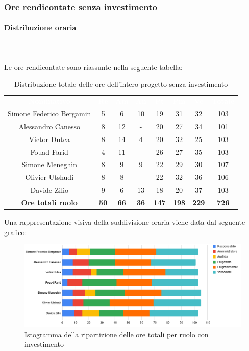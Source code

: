 \subsubsection{Ore rendicontate senza investimento}
\paragraph{Distribuzione oraria} \mbox{} \\ \mbox{} \\
Le ore rendicontate sono riassunte nella seguente tabella:

\begin{table}[H]
\centering\renewcommand{\arraystretch}{1.5}
\caption{Distribuzione totale delle ore dell'intero progetto senza investimento}
\vspace{0.2cm}
\begin{tabular}{ c | c | c | c | c | c | c | c }
\rowcolor{redafk}
\textcolor{white}{\textbf{Nominativo}} & \textcolor{white}{\textbf{Re}} & 
\textcolor{white}{\textbf{Am}} & \textcolor{white}{\textbf{An}} &
\textcolor{white}{\textbf{Pt}} & \textcolor{white}{\textbf{Pm}} &
\textcolor{white}{\textbf{Ve}} & \textcolor{white}{\textbf{Totale}} \\
Simone Federico Bergamin 	& 5 	& 6 	& 10	& 19	& 31	& 32 	& 103 \\
Alessandro Canesso 			& 8 	& 12	& - 	& 20	& 27	& 34 	& 101 \\
Victor Dutca 				& 8 	& 14	& 4 	& 20	& 32	& 25 	& 103 \\
Fouad Farid					& 4 	& 11	& - 	& 26	& 27	& 35 	& 103 \\
Simone Meneghin 			& 8 	& 9 	& 9 	& 22	& 29	& 30 	& 107 \\
Olivier Utshudi 			& 8 	& 8 	& - 	& 22	& 32	& 36 	& 106 \\
Davide Zilio 				& 9 	& 6 	& 13	& 18	& 20	& 37 	& 103 \\
\rowcolor{lastrowcolor}
\textbf{Ore totali ruolo} & \textbf{50} & \textbf{66} & \textbf{36} & \textbf{147} & \textbf{198} & \textbf{229} & \textbf{726} \\
\end{tabular}
\end{table}

Una rappresentazione visiva della suddivisione oraria viene data dal seguente grafico:
\begin{figure}[H]
\centering
\includegraphics[scale=0.60]{img/grafici/tabella_tot_no_analisi.png}
\caption{Istogramma della ripartizione delle ore totali per ruolo con investimento}
\end{figure}

